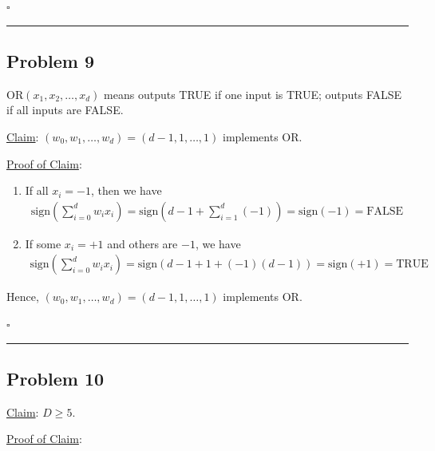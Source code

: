 \documentclass[12pt]{article}
\newcommand*{\QEDB}{\hfill\ensuremath{\square}}
\newcommand{\ParTh}[1]{\left(#1\right)}
\newcommand{\horrule}[1]{\rule{\linewidth}{#1}}
\begin{document}
\QEDB

\horrule{0.5pt}

\subsection*{Problem 9}

$\text{OR}\ParTh{x_1,x_2,\ldots,x_d}$ means outputs TRUE if one input is TRUE; outputs FALSE if all inputs are FALSE.

\underline{Claim}: $\ParTh{w_0,w_1,\ldots,w_d}=\ParTh{d-1,1,\ldots,1}$ implements $\text{OR}$.

\underline{Proof of Claim}:
\begin{enumerate}
	\item If all $x_i=-1$, then we have
	\begin{align}
	\text{sign}\ParTh{\sum_{i=0}^{d}w_ix_i}=\text{sign}\ParTh{d-1+\sum_{i=1}^{d}\ParTh{-1}}=\text{sign}\ParTh{-1}=\text{FALSE}
	\end{align}
	\item If some $x_i=+1$ and others are $-1$, we have
	\begin{align}
	\text{sign}\ParTh{\sum_{i=0}^{d}w_ix_i}=\text{sign}\ParTh{d-1+1+\ParTh{-1}\ParTh{d-1}}=\text{sign}\ParTh{+1}=\text{TRUE}
	\end{align}
\end{enumerate}
Hence, $\ParTh{w_0,w_1,\ldots,w_d}=\ParTh{d-1,1,\ldots,1}$ implements $\text{OR}$.

\QEDB

\horrule{0.5pt}

\subsection*{Problem 10}

\underline{Claim}: $D\geq5$.

\underline{Proof of Claim}:
\end{document}
